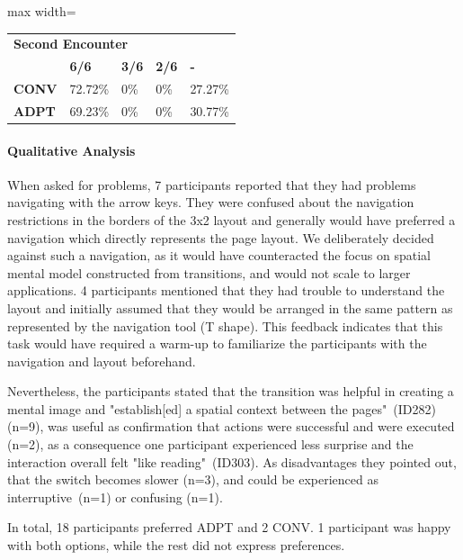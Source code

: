 \documentclass[sigconf]{nimeart}
\begin{document}
\begin{table}[htbp]\centering\small
\begin{adjustbox}{max width=\textwidth}\begin{tabular}{lllll}
\toprule
\midrule
\multicolumn{5}{l}{%
\textbf{Second Encounter}} \\
 & \textbf{6/6} & \textbf{3/6} & \textbf{2/6} & \textbf{-} \\
\textbf{CONV} & 72.72\% & 0\% & 0\% & 27.27\% \\
\textbf{ADPT} & 69.23\% & 0\% & 0\% & 30.77\% \\
\bottomrule
\end{tabular}\end{adjustbox}\end{table}

\paragraph{Qualitative Analysis}\label{qualitative-analysis-2}

When asked for problems, 7 participants reported that they had problems navigating with the arrow keys. They were confused about the navigation restrictions in the borders of the 3x2 layout and generally would have preferred a navigation which directly represents the page layout. We deliberately decided against such a navigation, as it would have counteracted the focus on spatial mental model constructed from transitions, and would not scale to larger applications. 4 participants mentioned that they had trouble to understand the layout and initially assumed that they would be arranged in the same pattern as represented by the navigation tool (T shape). This feedback indicates that this task would have required a warm-up to familiarize the participants with the navigation and layout beforehand.

Nevertheless, the participants stated that the transition was helpful in creating a mental image and "establish{[}ed{]} a spatial context between the pages"~(ID282) (n=9), was useful as confirmation that actions were successful and were executed (n=2), as a consequence one participant experienced less surprise and the interaction overall felt "like reading"~(ID303). As disadvantages they pointed out, that the switch becomes slower (n=3), and could be experienced as interruptive~(n=1) or confusing (n=1).

In total, 18 participants preferred ADPT and 2 CONV. 1 participant was happy with both options, while the rest did not express preferences.
\end{document}
